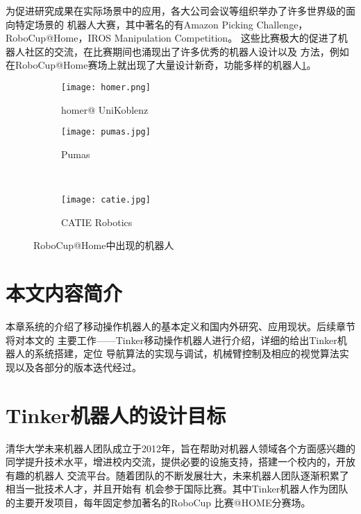为促进研究成果在实际场景中的应用，各大公司会议等组织举办了许多世界级的面向特定场景的
机器人大赛，其中著名的有Amazon Picking Challenge\cite{wurman2016amazon}，
RoboCup@Home\cite{wisspeintner2009robocup}，IROS Manipulation Competition\cite{moon2017iros}。
这些比赛极大的促进了机器人社区的交流，在比赛期间也涌现出了许多优秀的机器人设计以及
方法，例如在RoboCup@Home赛场上就出现了大量设计新奇，功能多样的机器人\ref{fig:other_teams}。

\begin{figure}
    \centering
    \begin{minipage}{.45\linewidth}
            \begin{subfigure}[t]{.9\linewidth}
                \texttt{[image: homer.png]}
                \caption{homer@ UniKoblenz}
            \end{subfigure}
    \end{minipage}
    \begin{minipage}{.45\linewidth}
        \begin{subfigure}[t]{.8\linewidth}
            \texttt{[image: pumas.jpg]}
            \caption{Pumas}
        \end{subfigure} \\
        \begin{subfigure}[b]{.8\linewidth}
            \texttt{[image: catie.jpg]}
            \caption{CATIE Robotics}
        \end{subfigure} 
    \end{minipage}
    \caption{RoboCup@Home中出现的机器人}
    \label{fig:other_teams}
\end{figure}

\section{本文内容简介}

本章系统的介绍了移动操作机器人的基本定义和国内外研究、应用现状。后续章节将对本文的
主要工作——Tinker移动操作机器人进行介绍，详细的给出Tinker机器人的系统搭建，定位
导航算法的实现与调试，机械臂控制及相应的视觉算法实现以及各部分的版本迭代经过。

\iffalse
\section{Tinker机器人的设计目标}

清华大学未来机器人团队成立于2012年，旨在帮助对机器人领域各个方面感兴趣的
同学提升技术水平，增进校内交流，提供必要的设施支持，搭建一个校内的，开放有趣的机器人
交流平台。随着团队的不断发展壮大，未来机器人团队逐渐积累了相当一批技术人才，并且开始有
机会参于国际比赛。其中Tinker机器人作为团队的主要开发项目，每年固定参加著名的RoboCup
比赛@HOME分赛场\cite{wisspeintner2009robocup}。

